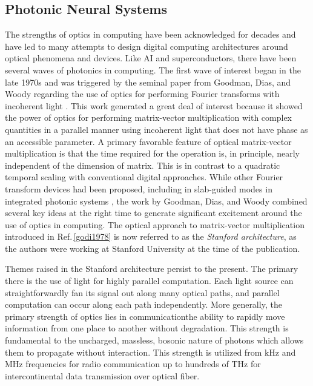 \subsection{\label{sec:photonic_neural_systems}Photonic Neural Systems}
The strengths of optics in computing have been acknowledged for decades and have led to many attempts to design digital computing architectures around optical phenomena and devices. Like AI and superconductors, there have been several waves of photonics in computing. The first wave of interest began in the late 1970s and was triggered by the seminal paper from Goodman, Dias, and Woody regarding the use of optics for performing Fourier transforms with incoherent light \cite{godi1978}. This work generated a great deal of interest because it showed the power of optics for performing matrix-vector multiplication with complex quantities in a parallel manner using incoherent light that does not have phase as an accessible parameter. A primary favorable feature of optical matrix-vector multiplication is that the time required for the operation is, in principle, nearly independent of the dimension of matrix. This is in contrast to a quadratic temporal scaling with conventional digital approaches. While other Fourier transform devices had been proposed, including in slab-guided modes in integrated photonic systems \cite{shha1968,anbo1977}, the work by Goodman, Dias, and Woody combined several key ideas at the right time to generate significant excitement around the use of optics in computing. The optical approach to matrix-vector multiplication introduced in Ref.\,\ref{godi1978} is now referred to as the \textit{Stanford architecture}, as the authors were working at Stanford University at the time of the publication.

Themes raised in the Stanford architecture persist to the present. The primary there is the use of light for highly parallel computation. Each light source can straightforwardly fan its signal out along many optical paths, and parallel computation can occur along each path independently. More generally, the primary strength of optics lies in communication\textemdash the ability to rapidly move information from one place to another without degradation. This strength is fundamental to the uncharged, massless, bosonic nature of photons which allows them to propagate without interaction. This strength is utilized from kHz and MHz frequencies for radio communication up to hundreds of THz for intercontinental data transmission over optical fiber.

